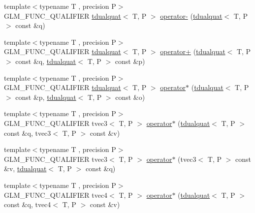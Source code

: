 \begin{DoxyCompactItemize}
\item 
{\footnotesize template$<$typename T , precision P$>$ }\\G\+L\+M\+\_\+\+F\+U\+N\+C\+\_\+\+Q\+U\+A\+L\+I\+F\+I\+E\+R \hyperlink{structglm_1_1tdualquat}{tdualquat}$<$ T, P $>$ \hyperlink{namespaceglm_a6502f16b761d62c1a4d9558c8403c509}{operator-\/} (\hyperlink{structglm_1_1tdualquat}{tdualquat}$<$ T, P $>$ const \&q)
\item 
{\footnotesize template$<$typename T , precision P$>$ }\\G\+L\+M\+\_\+\+F\+U\+N\+C\+\_\+\+Q\+U\+A\+L\+I\+F\+I\+E\+R \hyperlink{structglm_1_1tdualquat}{tdualquat}$<$ T, P $>$ \hyperlink{group__gtx__dual__quaternion_ga9d7cfca38c6ff90757705600da3c7972}{operator+} (\hyperlink{structglm_1_1tdualquat}{tdualquat}$<$ T, P $>$ const \&q, \hyperlink{structglm_1_1tdualquat}{tdualquat}$<$ T, P $>$ const \&p)
\item 
{\footnotesize template$<$typename T , precision P$>$ }\\G\+L\+M\+\_\+\+F\+U\+N\+C\+\_\+\+Q\+U\+A\+L\+I\+F\+I\+E\+R \hyperlink{structglm_1_1tdualquat}{tdualquat}$<$ T, P $>$ \hyperlink{group__gtx__dual__quaternion_ga2c224f87242fe82e8ebc17f01aa51126}{operator$\ast$} (\hyperlink{structglm_1_1tdualquat}{tdualquat}$<$ T, P $>$ const \&p, \hyperlink{structglm_1_1tdualquat}{tdualquat}$<$ T, P $>$ const \&o)
\item 
{\footnotesize template$<$typename T , precision P$>$ }\\G\+L\+M\+\_\+\+F\+U\+N\+C\+\_\+\+Q\+U\+A\+L\+I\+F\+I\+E\+R tvec3$<$ T, P $>$ \hyperlink{namespaceglm_af87c18c3c73e45b62f6d895c323f4a5f}{operator$\ast$} (\hyperlink{structglm_1_1tdualquat}{tdualquat}$<$ T, P $>$ const \&q, tvec3$<$ T, P $>$ const \&v)
\item 
{\footnotesize template$<$typename T , precision P$>$ }\\G\+L\+M\+\_\+\+F\+U\+N\+C\+\_\+\+Q\+U\+A\+L\+I\+F\+I\+E\+R tvec3$<$ T, P $>$ \hyperlink{namespaceglm_ad837ea15bead96f4ecb1335c61c05697}{operator$\ast$} (tvec3$<$ T, P $>$ const \&v, \hyperlink{structglm_1_1tdualquat}{tdualquat}$<$ T, P $>$ const \&q)
\item 
{\footnotesize template$<$typename T , precision P$>$ }\\G\+L\+M\+\_\+\+F\+U\+N\+C\+\_\+\+Q\+U\+A\+L\+I\+F\+I\+E\+R tvec4$<$ T, P $>$ \hyperlink{namespaceglm_af7e4c7f9357bbbd507b6c3e21c615155}{operator$\ast$} (\hyperlink{structglm_1_1tdualquat}{tdualquat}$<$ T, P $>$ const \&q, tvec4$<$ T, P $>$ const \&v)
\item 

\end{DoxyCompactItemize}
